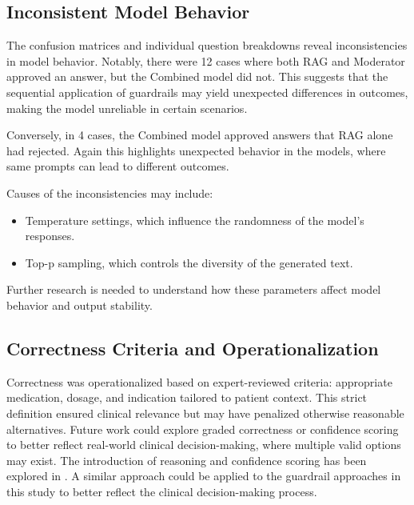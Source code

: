 \subsection{Inconsistent Model Behavior}
The confusion matrices and individual question breakdowns reveal inconsistencies in model behavior.
Notably, there were 12 cases where both RAG and Moderator approved an answer, but the Combined model did not.
This suggests that the sequential application of guardrails may yield unexpected differences in outcomes, making the model unreliable in certain scenarios.

Conversely, in 4 cases, the Combined model approved answers that RAG alone had rejected.
Again this highlights unexpected behavior in the models, where same prompts can lead to different outcomes.

Causes of the inconsistencies may include:
\begin{itemize}
    \item Temperature settings, which influence the randomness of the model's responses.
    \item Top-p sampling, which controls the diversity of the generated text.
\end{itemize}
Further research is needed to understand how these parameters affect model behavior and output stability.

\subsection{Correctness Criteria and Operationalization}
Correctness was operationalized based on expert-reviewed criteria: appropriate medication, dosage, and indication tailored to patient context.
This strict definition ensured clinical relevance but may have penalized otherwise reasonable alternatives.
Future work could explore graded correctness or confidence scoring to better reflect real-world clinical decision-making, where multiple valid options may exist.
The introduction of reasoning and confidence scoring has been explored in \citep{kang2024r}.
A similar approach could be applied to the guardrail approaches in this study to better reflect the clinical decision-making process.


